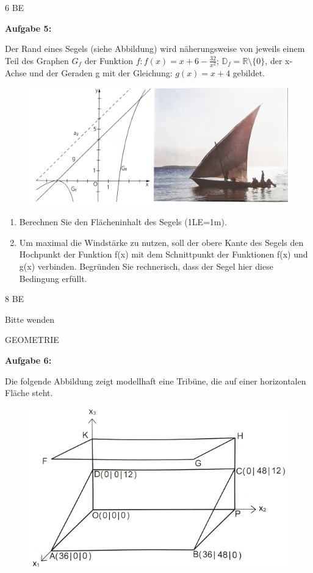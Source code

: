\documentclass[a4paper,12pt]{article}
\newcommand{\Aufgabe}[1]{
  {
  \vspace*{0.5cm}
  \textsf{\textbf{Aufgabe #1}}
  \vspace*{0.2cm}
  
  }
}
\begin{document}
\begin{flushright}6 BE \end{flushright}
\newpage





\Aufgabe {5:} 
Der Rand eines Segels (siehe Abbildung) wird näherungsweise von jeweils einem Teil des Graphen $G_f$ der Funktion $f: f(x)=x+6-\frac{32}{x^2}$;
$ \mathbb{D}_f= \mathbb{R}\setminus \{0\}$, der x-Achse und der Geraden g mit der Gleichung: $g(x)=x+4$ gebildet.

\begin{figure}[h!]
  \begin{center}
    \includegraphics[width=1 \linewidth]{bols201202.jpeg}
  \end{center}
\end{figure}

\begin{enumerate}[label={\alph*)}]
\item Berechnen Sie den Flächeninhalt des Segels (1LE=1m).
\item Um maximal die Windstärke zu nutzen, soll der obere Kante des Segels den Hochpunkt der Funktion f(x) mit dem Schnittpunkt der Funktionen f(x) und g(x) verbinden. Begründen Sie rechnerisch, dass der Segel hier diese Bedingung erfüllt. 
\end{enumerate}  
\begin{flushright}8 BE \end{flushright}
\begin{flushright}Bitte wenden \end{flushright}
\newpage
\addtolength{\voffset}{-2cm}

GEOMETRIE
\Aufgabe{6:} 
Die folgende Abbildung zeigt modellhaft eine Tribüne, die auf einer horizontalen Fläche steht.

\begin{figure}[h!]
  \begin{center}
    \includegraphics[width=0.5\linewidth]{tribüne.jpg}
  \end{center}
\end{figure}
\end{document}

